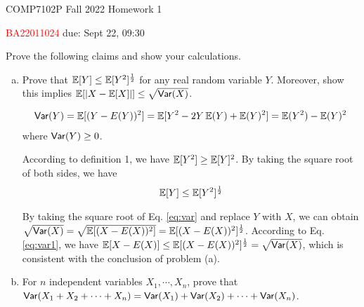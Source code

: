 



\noindent
\hspace*{.2in} COMP7102P Fall 2022
\hfill Homework 1\\
\begin{CJK}{UTF8}{gbsn}
\hspace*{.2in} \textcolor{red}{BA22011024 \Name{} \ChineseName} \hfill due: Sept 22, 09:30
\end{CJK}

\bigskip

\begin{problem}[30 points]
Prove the following claims and show your calculations.
\begin{enumerate}[(a)]
\item Prove that $\operatorname*{\mathbb{E}}[Y] \le \operatorname*{\mathbb{E}}[Y^2]^\frac{1}{2}$ for any real random variable $Y$. Moreover, show this implies $\operatorname*{\mathbb{E}}[|X - \operatorname*{\mathbb{E}}[X]|] \le \sqrt{\mathsf{Var}(X)}$.

\Answer
\begin{definition}
    \begin{align}\label{eq:var}
        \mathsf{Var}(Y) = \operatorname*{\mathbb{E}}[(Y - E(Y))^2] = \operatorname*{\mathbb{E}}[Y^2 - 2Y\operatorname*{\mathbb{E}}(Y) + \operatorname*{\mathbb{E}}(Y)^2] = \operatorname*{\mathbb{E}}(Y^2) - \operatorname*{\mathbb{E}}(Y)^2
    \end{align}
    where $\mathsf{Var}(Y) \ge 0$.
\end{definition}

According to definition 1, we have  $\operatorname*{\mathbb{E}}[Y^2] \ge \operatorname*{\mathbb{E}}[Y]^2$. By taking the square root of both sides, we have 
\begin{align}\label{eq:var1}
    \operatorname*{\mathbb{E}}[Y] \le \operatorname*{\mathbb{E}}[Y^2]^\frac{1}{2}
\end{align}

By taking the square root of Eq. \eqref{eq:var} and replace $Y$ with $X$, we can obtain $\sqrt{\mathsf{Var}(X)} = \sqrt{\operatorname*{\mathbb{E}}[(X - E(X))^2]} = \operatorname*{\mathbb{E}}[(X - E(X))^2]^\frac{1}{2}$. According to Eq. \eqref{eq:var1}, we have $\operatorname*{\mathbb{E}}[X - E(X)] \le \operatorname*{\mathbb{E}}[(X - E(X))^2]^\frac{1}{2} = \sqrt{\mathsf{Var}(X)}$, which is consistent with the conclusion of problem (a).

\item For $n$ independent variables $X_1, \cdots, X_n$, prove that $\mathsf{Var}(X_1 + X_2 + \cdots + X_n) = \mathsf{Var}(X_1) + \mathsf{Var}(X_2) + \cdots + \mathsf{Var}(X_n)$.

\Answer


\end{enumerate}
\end{problem}
